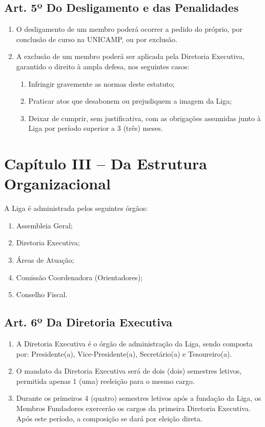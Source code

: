 \documentclass[12pt, a4paper]{article}
\begin{document}
\subsection{Art. 5º Do Desligamento e das Penalidades}
\begin{enumerate}[label=\S \arabic*.]
    \item O desligamento de um membro poderá ocorrer a pedido do próprio, por conclusão de curso na UNICAMP, ou por exclusão.
    \item A exclusão de um membro poderá ser aplicada pela Diretoria Executiva, garantido o direito à ampla defesa, nos seguintes casos:
    \begin{enumerate}[label=\alph*)]
        \item Infringir gravemente as normas deste estatuto;
        \item Praticar atos que desabonem ou prejudiquem a imagem da Liga;
        \item Deixar de cumprir, sem justificativa, com as obrigações assumidas junto à Liga por período superior a 3 (três) meses.
    \end{enumerate}
\end{enumerate}


\section{Capítulo III – Da Estrutura Organizacional}


A Liga é administrada pelos seguintes órgãos:
\begin{enumerate}[label=\alph*)]
    \item Assembleia Geral;
    \item Diretoria Executiva;
    \item Áreas de Atuação;
    \item Comissão Coordenadora (Orientadores);
    \item Conselho Fiscal.
\end{enumerate}

\subsection{Art. 6º Da Diretoria Executiva}
\begin{enumerate}[label=\S \arabic*.]
    \item A Diretoria Executiva é o órgão de administração da Liga, sendo composta por: Presidente(a), Vice-Presidente(a), Secretário(a) e Tesoureiro(a).
    \item O mandato da Diretoria Executiva será de dois (dois) semestres letivos, permitida apenas 1 (uma) reeleição para o mesmo cargo.
    \item Durante os primeiros 4 (quatro) semestres letivos após a fundação da Liga, os Membros Fundadores exercerão os cargos da primeira Diretoria Executiva. Após este período, a composição se dará por eleição direta.
\end{enumerate}
\end{document}
